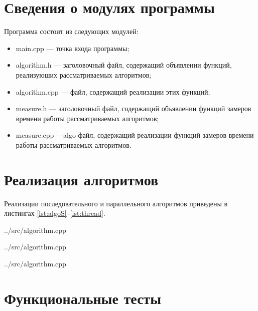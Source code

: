 \section{Сведения о модулях программы}

Программа состоит из следующих модулей:

\begin{itemize}
	\item main.cpp --- точка входа программы;
	\item algorithm.h --- заголовочный файл, содержащий объявлении функций, реализуюших рассматриваемых алгоритмов;
	\item algorithm.cpp --- файл, содержащий реализации этих функций;
	\item measure.h --- заголовочный файл, содержащий объявлении функций замеров времени работы рассматриваемых алгоритмов;
	\item measure.cpp ---algo файл, содержащий реализации функций замеров времени работы рассматриваемых алгоритмов.
\end{itemize}


\section{Реализация алгоритмов}
Реализации последовательного и параллельного алгоритмов приведены в листингах \ref{lst:algoS}--\ref{lst:thread}.

\begin{lstinputlisting}[
	caption={Последовательный алгоритм поиска подстроки в строке полным перебором},
	label={lst:algoS},
	linerange={4-28}
	]{../src/algorithm.cpp}
\end{lstinputlisting}

\begin{lstinputlisting}[
	caption={Параллельный алгоритм поиска подстроки в строке полным перебором},
	label={lst:radix},
	linerange={60-87}
	]{../src/algorithm.cpp}
\end{lstinputlisting}

\begin{lstinputlisting}[
	caption={Задача одного потока},
	label={lst:thread},
	linerange={31-57}
	]{../src/algorithm.cpp}
\end{lstinputlisting}




\section{Функциональные тесты}

